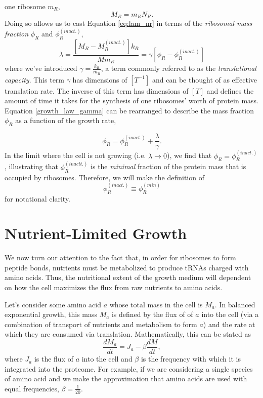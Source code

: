 \documentclass[letterpaper, 11pt]{article}
\begin{document}
one ribosome $m_R$, 
\begin{equation}
M_R = m_R N_R.
\label{eq:ribo_mass}
\end{equation}
Doing so allows us to cast Equation \eqref{eq:lam_nr} in terms of the
\textit{ribosomal mass fraction} $\phi_R$ and $\phi_R^{(inact.)}$, 
\begin{equation}
\lambda = \frac{\left[M_R - M_R^{(inact.)}\right]k_R}{M m_R} = \gamma\left[\phi_R - \phi_R^{(inact.)}\right]
\label{eq:growth_law_gamma}
\end{equation}
where we've introduced $\gamma = \frac{k_R}{m_R}$, a term commonly referred to
as  the \textit{translational capacity}. This term $\gamma$ has dimensions of
$[T^{-1}]$ and can be thought of as effective translation rate. The inverse of
this term has dimensions of $[T]$ and defines the amount of time it takes for 
the synthesis of one ribosomes' worth of protein mass. Equation
\eqref{growth_law_gamma} can be rearranged to describe the mass fraction
$\phi_R$ as a function of the growth rate, 

\begin{equation}
\phi_R = \phi_R^{(inact.)} + \frac{\lambda}{\gamma}.
\label{eq:growth_law_gamma_phir}
\end{equation}
In the limit where the cell is not growing (i.e. $\lambda \rightarrow 0$), we 
find that $\phi_R = \phi_R^{(inact.)}$, illustrating that $\phi_R^{(inactt.)}$ 
is the \textit{minimal} fraction of the protein mass that is occupied by
ribosomes. Therefore, we will make the definition of 
\begin{equation}
\phi_R^{(inact.)} \equiv \phi_R^{(min)}
\label{eq:phir_min_def}
\end{equation}
for notational clarity. 

\section{Nutrient-Limited Growth}
We now turn our attention to the fact that, in order for ribosomes to form 
peptide bonds, nutrients must be metabolized to produce tRNAs charged with amino
acids. Thus, the nutritional extent of the growth medium will dependent on 
how the cell maximizes the flux from raw nutrients to amino acids. 

Let's consider some amino acid $a$ whose total mass in the cell is $M_a$. In
balanced exponential growth, this mass $M_a$ is defined by the flux of of $a$ 
into the cell (via a combination of transport of nutrients and metabolism to
form $a$) and the rate at which they are consumed via translation.
Mathematically, this can be stated as
\begin{equation}
\frac{dM_a}{dt} = J_a - \beta \frac{dM}{dt},
\label{eq:dma_dt}
\end{equation}
where $J_a$ is the flux of $a$ into the cell and $\beta$ is the frequency with
which it is integrated into the proteome. For example, if we are considering a
single species of amino acid and we make the approximation that amino acids are 
used with equal frequencies, $\beta = \frac{1}{20}$. 
\end{document}
